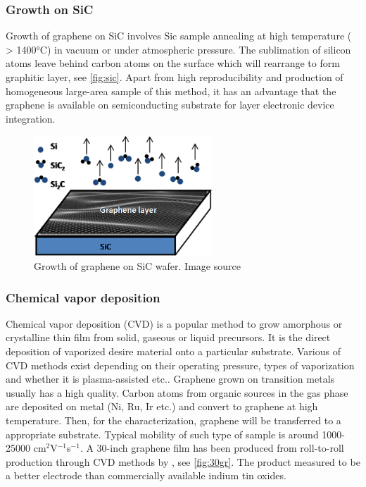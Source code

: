\subsubsection{Growth on SiC}

Growth of graphene on SiC involves Sic sample annealing at high temperature ( > 1400\si{\celsius}) in vacuum or under atmospheric pressure. The sublimation of silicon atoms leave behind carbon atoms on the surface which will rearrange to form graphitic layer\cite{Mishra2016}, see \autoref{fig:sic}. Apart from high reproducibility and production of homogeneous large-area sample of this method, it has an advantage that the graphene is available on semiconducting substrate for layer electronic device integration. 

\begin{figure}[htbp!] 
\centering  
\includegraphics[width=0.6\textwidth]{gr-sic.png}
\caption{Growth of graphene on SiC wafer. Image source \cite{mishra2016graphene}}  
\label{fig:sic}
\end{figure} 

\subsubsection{Chemical vapor deposition}

Chemical vapor deposition (CVD) is a popular method to grow amorphous or crystalline thin film from solid, gaseous or liquid precursors. It is the direct deposition of vaporized desire material onto a particular substrate. Various of CVD methods exist depending on their operating pressure, types of vaporization and whether it is plasma-assisted etc.. Graphene grown on transition metals usually has a high quality. Carbon atoms from organic sources in the gas phase are deposited on metal (Ni, Ru, Ir etc.) and convert to graphene at high temperature. Then, for the characterization, graphene will be transferred to a appropriate substrate. Typical mobility of such type of sample is around 1000-25000 cm$^2$V$^{-1}$s$^{-1}$\cite{Petrone2012}. A 30-inch graphene film has been produced from roll-to-roll production through CVD methods by \citet{Bae2010}, see \autoref{fig:30gr}. The product measured to be a better electrode than commercially available indium tin oxides.

